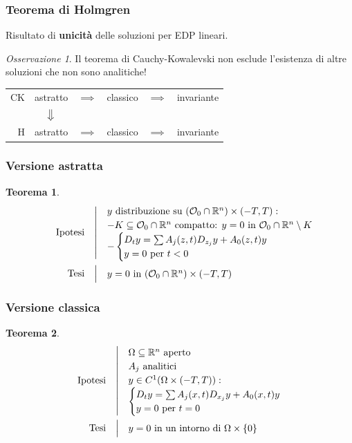 \documentclass[serif,notheorems]{beamer}
\makeatletter
\newenvironment{ipotesi}%
{\quad\left|\quad\def\arraystretch{1.2}\begin{array}{@{}l@{}}}%
{\end{array}\right.}
\newcommand{\hpth}[2]
{
\begin{align*}
\quad
\text{Ipotesi}
&\begin{ipotesi}
#1
\end{ipotesi}\\
\text{Tesi}
&\begin{ipotesi}
#2
\end{ipotesi}
\end{align*}
}
\theoremstyle{definition} %
\newtheorem{theorem}{Teorema}[section] %
\theoremstyle{remark}
\newtheorem*{remark}{Osservazione}
\makeatother
\begin{document}
\begin{frame}
\frametitle{Teorema di Holmgren}
Risultato di \textbf{unicità} delle soluzioni per EDP lineari.
\begin{remark}
Il teorema di Cauchy-Kowalevski non esclude l'esistenza di altre soluzioni che non sono analitiche!
\end{remark}
\end{frame}

\begin{frame}
\begin{table}
\renewcommand{\arraystretch}{1.5}
\begin{tabular}{r||ccccc} 
CK & astratto & $\implies$  & classico & $\implies$ & invariante\\
&$\big\Downarrow$ &&&&\\
H & astratto & $\implies$ & classico & $\implies$ & invariante\\
\end{tabular}
\end{table}
\end{frame}

\begin{frame}
\frametitle{Versione astratta}
\begin{theorem}
\hpth{
y \text{ distribuzione su } (\mathcal{O}_0 \cap \mathbb{R}^n) \times (-T,T):\\
- K\subseteq  \mathcal{O}_0 \cap \mathbb{R}^n \text{ compatto: } y=0  \text{ in } \mathcal{O}_0 \cap \mathbb{R}^n \setminus K\\
- \begin{cases}
D_t y = \sum A_j (z,t) D_{z_j}y+A_0(z,t)y \\
y=0 \text{ per } t<0
\end{cases}\\
}{
y = 0 \text{ in } (\mathcal{O}_0 \cap \mathbb{R}^n) \times (-T,T) \\
}
\end{theorem}
\end{frame}

\begin{frame}
\frametitle{Versione classica}
\begin{theorem}
\hpth{
\Omega \subseteq \mathbb{R}^n \text{ aperto}\\
A_j \text{ analitici}\\
y\in C^1 (\Omega \times (-T,T)): \\ 
\begin{cases}
D_t y = \sum A_j (x,t) D_{x_j}y+A_0(x,t)y \\
y=0 \text{ per } t=0
\end{cases} \\
}{
y = 0 \text{ in un intorno di } \Omega \times \{ 0\}
}
\end{theorem}
\end{frame}
\end{document}
